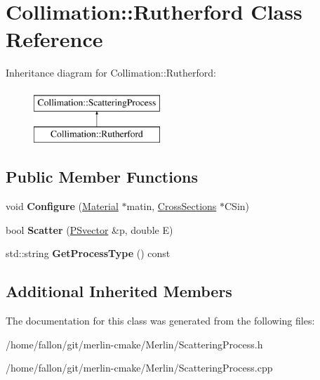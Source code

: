\hypertarget{classCollimation_1_1Rutherford}{}\section{Collimation\+:\+:Rutherford Class Reference}
\label{classCollimation_1_1Rutherford}
Inheritance diagram for Collimation\+:\+:Rutherford\+:\begin{figure}[H]
\begin{center}
\leavevmode
\includegraphics[height=2.000000cm]{classCollimation_1_1Rutherford}
\end{center}
\end{figure}
\subsection*{Public Member Functions}
\begin{DoxyCompactItemize}
\item 
\mbox{\label{classCollimation_1_1Rutherford_a39761c3e56d41e0e7562d3ecd7e335c7}} 
void {\bfseries Configure} (\hyperlink{classMaterial}{Material} $\ast$matin, \hyperlink{classCollimation_1_1CrossSections}{Cross\+Sections} $\ast$C\+Sin)
\item 
\mbox{\label{classCollimation_1_1Rutherford_a4a58821d03ec9daf314e953f45292f10}} 
bool {\bfseries Scatter} (\hyperlink{classPSvector}{P\+Svector} \&p, double E)
\item 
\mbox{\label{classCollimation_1_1Rutherford_aa6453ca45a1ccc3f041d350f5361d217}} 
std\+::string {\bfseries Get\+Process\+Type} () const
\end{DoxyCompactItemize}
\subsection*{Additional Inherited Members}


The documentation for this class was generated from the following files\+:\begin{DoxyCompactItemize}
\item 
/home/fallon/git/merlin-\/cmake/\+Merlin/Scattering\+Process.\+h\item 
/home/fallon/git/merlin-\/cmake/\+Merlin/Scattering\+Process.\+cpp\end{DoxyCompactItemize}
